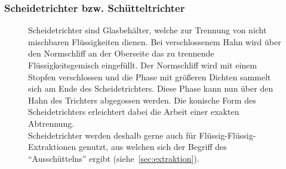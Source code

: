  \newpage
 
\subsubsection*{Scheidetrichter bzw. Schütteltrichter}
\begin{figure}[h!]
	\begin{minipage}[t]{0.68\textwidth}
		\vspace{0pt}
		Scheidetrichter sind Glasbehälter, welche zur Trennung von nicht mischbaren Flüssigkeiten dienen. Bei verschlossenem Hahn wird über den Normschliff an der Oberseite das zu trennende Flüssigkeitsgemisch eingefüllt. Der Normschliff wird mit einem Stopfen verschlossen und die Phase mit größeren Dichten sammelt sich am Ende des Scheidetrichters. Diese Phase kann nun über den Hahn des Trichters abgegossen werden. Die konische Form des Scheidetrichters erleichtert dabei die Arbeit einer exakten Abtrennung.\\
		Scheidetrichter werden deshalb gerne auch für Flüssig-Flüssig-Extraktionen genutzt, aus welchen sich der Begriff des "`Ausschüttelns"' ergibt \mbox{(siehe \ref{sec:extraktion})}.
	\end{minipage}
	\hfill
	\begin{minipage}[t]{0.30\textwidth}
		\vspace{0pt}
		\centering

\end{minipage}
\end{figure}
